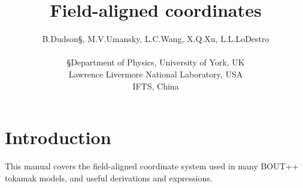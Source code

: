 \documentclass[12pt]{article}
\begin{document}
\title{Field-aligned coordinates}
\author{B.Dudson\S, M.V.Umansky\dag, L.C.Wang\ddag, X.Q.Xu\dag,
L.L.LoDestro\dag \\
\\
  \S Department of Physics, University of York, UK \\
  \dag Lawrence Livermore National Laboratory, USA \\
  \ddag IFTS, China}
  \date{}
\maketitle

\tableofcontents





\section{Introduction}
%
This manual covers the field-aligned coordinate system used in many BOUT++
tokamak models, and useful derivations and expressions.
\end{document}
